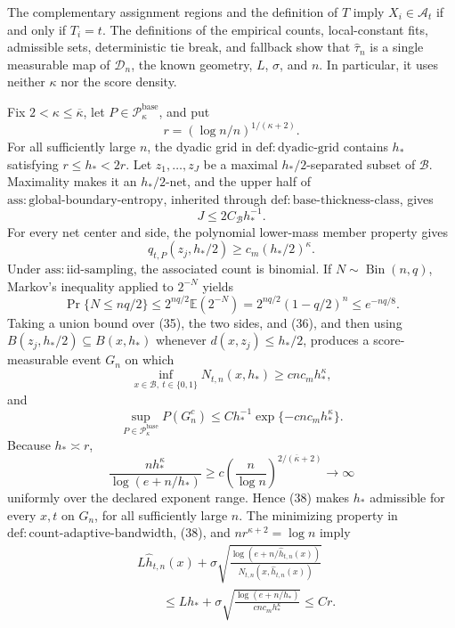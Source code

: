 The complementary assignment regions and the definition of \(T\) imply \(X_i\in\mathcal A_t\) if and only if \(T_i=t\). The definitions of the empirical counts, local-constant fits, admissible sets, deterministic tie break, and fallback show that \(\widehat\tau_n\) is a single measurable map of \(\mathcal D_n\), the known geometry, \(L\), \(\sigma\), and \(n\). In particular, it uses neither \(\kappa\) nor the score density.

Fix \(2<\kappa\le\overline\kappa\), let \(P\in\mathcal P_{\kappa}^{\mathrm{base}}\), and put
\[
 r=(\log n/n)^{1/(\kappa+2)}.
\]
For all sufficiently large \(n\), the dyadic grid in \(\mathrm{def:dyadic\text{-}grid}\) contains \(h_*\) satisfying \(r\le h_*<2r\). Let \(z_1,\ldots,z_J\) be a maximal \(h_*/2\)-separated subset of \(\mathcal B\). Maximality makes it an \(h_*/2\)-net, and the upper half of \(\mathrm{ass:global\text{-}boundary\text{-}entropy}\), inherited through \(\mathrm{def:base\text{-}thickness\text{-}class}\), gives
\[
 J\le 2C_{\mathcal B}h_*^{-1}. \tag{35}
\]
For every net center and side, the polynomial lower-mass member property gives
\[
 q_{t,P}(z_j,h_*/2)\ge c_m(h_*/2)^\kappa. \tag{36}
\]
Under \(\mathrm{ass:iid\text{-}sampling}\), the associated count is binomial. If \(N\sim\operatorname{Bin}(n,q)\), Markov's inequality applied to \(2^{-N}\) yields
\[
 \Pr\{N\le nq/2\}
 \le 2^{nq/2}\mathbb E(2^{-N})
 =2^{nq/2}(1-q/2)^n
 \le e^{-nq/8}. \tag{37}
\]
Taking a union bound over (35), the two sides, and (36), and then using \(B(z_j,h_*/2)\subseteq B(x,h_*)\) whenever \(d(x,z_j)\le h_*/2\), produces a score-measurable event \(G_n\) on which
\[
 \inf_{x\in\mathcal B,\ t\in\{0,1\}}N_{t,n}(x,h_*)
 \ge c n c_mh_*^\kappa, \tag{38}
\]
and
\[
 \sup_{P\in\mathcal P_{\kappa}^{\mathrm{base}}}P(G_n^c)
 \le Ch_*^{-1}\exp\{-c n c_mh_*^\kappa\}. \tag{39}
\]
Because \(h_*\asymp r\),
\[
 \frac{nh_*^\kappa}{\log(e+n/h_*)}
 \ge c\left(\frac n{\log n}\right)^{2/(\overline\kappa+2)}\longrightarrow\infty \tag{40}
\]
uniformly over the declared exponent range. Hence (38) makes \(h_*\) admissible for every \(x,t\) on \(G_n\), for all sufficiently large \(n\). The minimizing property in \(\mathrm{def:count\text{-}adaptive\text{-}bandwidth}\), (38), and \(nr^{\kappa+2}=\log n\) imply
\[
 \begin{aligned}
 &L\widehat h_{t,n}(x)
 +\sigma\sqrt{\frac{\log(e+n/\widehat h_{t,n}(x))}
 {N_{t,n}(x,\widehat h_{t,n}(x))}}\\
 &\qquad\le Lh_*+
 \sigma\sqrt{\frac{\log(e+n/h_*)}{c n c_mh_*^\kappa}}
 \le Cr.
 \end{aligned} \tag{41}
\]

